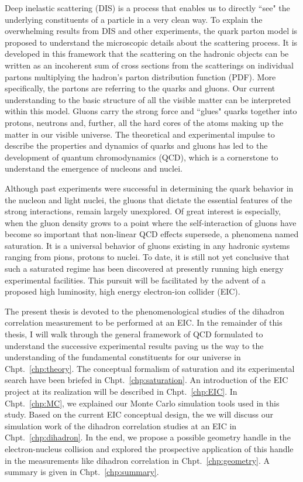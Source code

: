Deep inelastic scattering (DIS) is a process that enables us to directly ``see"
the underlying constituents of a particle in a very clean way. To explain the
overwhelming results from DIS and other experiments, the quark parton model is
proposed to understand the microscopic details about the scattering process. It
is developed in this framework that the scattering on the hadronic objects can
be written as an incoherent sum of cross sections from the scatterings on
individual partons multiplying the hadron's parton distribution function (PDF).
More specifically, the partons are referring to the quarks and gluons. Our
current understanding to the basic structure of all the visible matter can be
interpreted within this model. Gluons carry the strong force and
``glues" quarks together into protons, neutrons and, further, all the hard
cores of the atoms making up the matter in our visible universe. The theoretical
and experimental impulse to describe the properties and dynamics of quarks and
gluons has led to the development of quantum chromodynamics (QCD), which is a
cornerstone to understand the emergence of nucleons and nuclei.


Although past experiments were successful in determining the quark behavior in
the nucleon and light nuclei, the gluons that dictate the essential features
of the strong interactions, remain largely unexplored. Of great interest is
especially, when the gluon density grows to a point where the self-interaction
of gluons have become so important that non-linear QCD effects supersede, a
phenomena named saturation. It is a universal behavior of gluons existing in any
hadronic systems ranging from pions, protons to nuclei. To date, it is still not
yet conclusive that such a saturated regime has been discovered at presently
running high energy experimental facilities. This pursuit will be facilitated by
the advent of a proposed high luminosity, high energy electron-ion collider (EIC).


The present thesis is devoted to the phenomenological studies of the dihadron
correlation measurement to be performed at an EIC. In the remainder of this
thesis, I will walk through the general framework of QCD formulated to
understand the successive experimental results paving us the way to the
understanding of the fundamental constituents for our universe in
Chpt.~\ref{chp:theory}. The conceptual formalism of saturation and its
experimental search have been briefed in Chpt.~\ref{chp:saturation}. An
introduction of the EIC project at its realization will be described in
Chpt.~\ref{chp:EIC}. In Chpt.~\ref{chp:MC}, we explained our Monte Carlo
simulation tools used in this study. Based on the current EIC conceptual design,
the we will discuss our simulation work of the dihadron correlation studies at
an EIC in Chpt.~\ref{chp:dihadron}. In the end, we propose a possible geometry
handle in the electron-nucleus collision and explored the prospective
application of this handle in the measurements like dihadron correlation in
Chpt.~\ref{chp:geometry}. A summary is given in Chpt.~\ref{chp:summary}.

